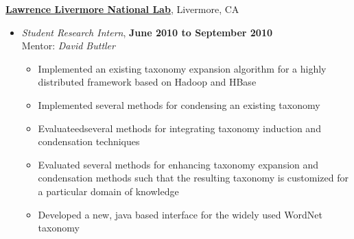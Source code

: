 \documentclass[10pt]{article}
\newenvironment{outerlist}[1][\enskip\textbullet]%
        {\begin{itemize}[#1,leftmargin=*]}{\end{itemize}%
         \vspace{-.6\baselineskip}}
\newenvironment{innerlist}[1][\enskip\textbullet]%
        {\begin{itemize}[#1,leftmargin=*,parsep=0pt,itemsep=0pt,topsep=0pt,partopsep=0pt]}
        {\end{itemize}}
\begin{document}
\href{http://www.llnl.gov}{\textbf{Lawrence Livermore National Lab}}, 
Livermore, CA
\begin{outerlist}

\item[] \textit{Student Research Intern},
        \textbf{June 2010 to September 2010}\\
        Mentor: \textit{David Buttler} \\

        \begin{innerlist}
        \item Implemented an existing taxonomy expansion algorithm for a highly
              distributed framework based on Hadoop and HBase
        \item Implemented several methods for condensing an existing taxonomy
        \item Evaluateedseveral methods for integrating taxonomy induction and
              condensation techniques
        \item Evaluated several methods for enhancing taxonomy expansion
              and condensation methods such that the resulting taxonomy is
              customized for a particular domain of knowledge
        \item Developed a new, java based interface for the widely used WordNet
              taxonomy \\
       \end{innerlist}
\end{outerlist}
\end{document}
